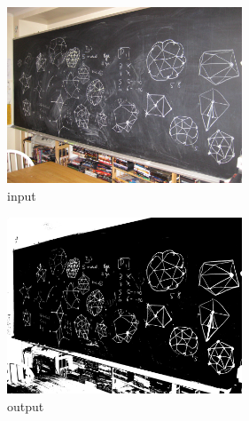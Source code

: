 \documentclass[12pt,a4paper]{article}
\theoremstyle{definition}
\theoremstyle{remark}
\theoremstyle{plain}
\begin{document}
\begin{multicols}{2}
\begin{figure}[H]
\centering
\includegraphics[width=7cm]{codes/images/blackboard.jpg}
  \caption{input}
\end{figure}
\columnbreak
\begin{figure}[H]
\centering
\includegraphics[width=7cm]{codes/images/blackboard_binarized.png}
  \caption{output}
\end{figure}
\end{multicols}
\end{document}
